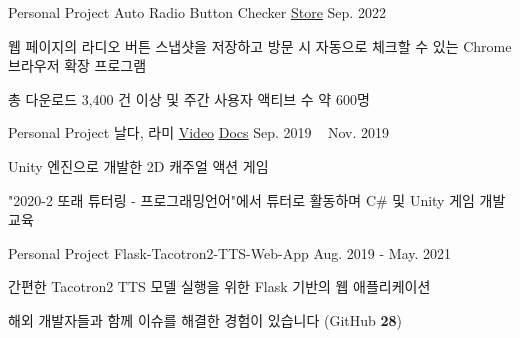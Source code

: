 \begin{cventries}
  \cventry
  {Personal Project} %
  {Auto Radio Button Checker} %
  {\href{https://chromewebstore.google.com/detail/auto-radio-button-checker/phkflnpejpgehjgficbbikeclfcageic?hl=ko}{\faChrome\space Store} \space \href{https://github.com/Verssae/AutoRadioButtonChecker}{\githubCode} } %
  {Sep. 2022} %
  {
    \begin{cvitems} %
      \item {웹 페이지의 라디오 버튼 스냅샷을 저장하고 방문 시 자동으로 체크할 수 있는 Chrome 브라우저 확장 프로그램}
      \item {총 다운로드 3,400 건 이상 및 주간 사용자 액티브 수 약 600명}
    \end{cvitems}
  }

  \cventry
  {Personal Project} %
  {날다, 라미} %
  {\href{https://youtu.be/dygD1wzavr8?si=dvC0UiG-BkSIu1Si}{\faYoutube\space Video} \href{https://cheddar-taxicab-6ed.notion.site/199f666eca084723b1e48f366d71fce1}{\faStickyNote\space Docs} \href{https://github.com/Verssae/Rami?tab=readme-ov-file}{\githubCode} } %
  {Sep. 2019 ~ Nov. 2019} %
  {
    \begin{cvitems} %
      \item {Unity 엔진으로 개발한 2D 캐주얼 액션 게임}
      \item {"2020-2 또래 튜터링 - 프로그래밍언어"에서 튜터로 활동하며 C\# 및 Unity 게임 개발 교육}
    \end{cvitems}
  }

  \cventry
  {Personal Project} %
  {Flask-Tacotron2-TTS-Web-App} %
  {\href{https://github.com/Verssae/flask-tacotron2-tts-web-app}{\githubCode} } %
  {Aug. 2019 - May. 2021} %
  {
    \begin{cvitems} %
      \item {간편한 Tacotron2 TTS 모델 실행을 위한 Flask 기반의 웹 애플리케이션}
      \item {해외 개발자들과 함께 이슈를 해결한 경험이 있습니다  (GitHub \faStar\space \textbf{28})}
    \end{cvitems}
  }
\end{cventries}
